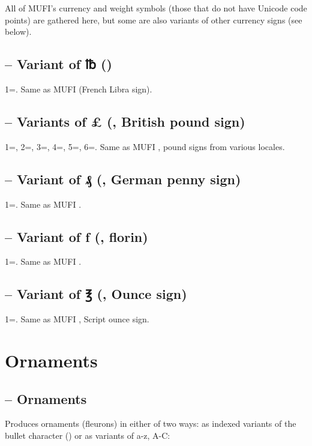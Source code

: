 \noindent All of MUFI’s currency and weight symbols (those that do
not have Unicode code points) are gathered here, but some are also variants of other currency signs (see below).

\subsection{ – Variant of ℔ ()}
1=. Same as MUFI  (French Libra sign).

\subsection{ – Variants of {\pounds} (, British pound sign)}
1=, 2=, 3=, 4=,
5=, 6=. Same as MUFI , pound signs from various locales.

\subsection{ – Variant of ₰ (, German penny sign)}
1=. Same as MUFI .

\subsection{ – Variant of ƒ (, florin)}
1=. Same as MUFI .

\subsection{ – Variant of ℥ (, Ounce sign)}
1=. Same as MUFI , Script ounce sign.

\section{Ornaments}
\subsection{ – Ornaments}\hypertarget{ornm}{}
Produces ornaments (fleurons) in either of two ways: as indexed variants of the bullet character () or as
variants of a-z, A-C:

